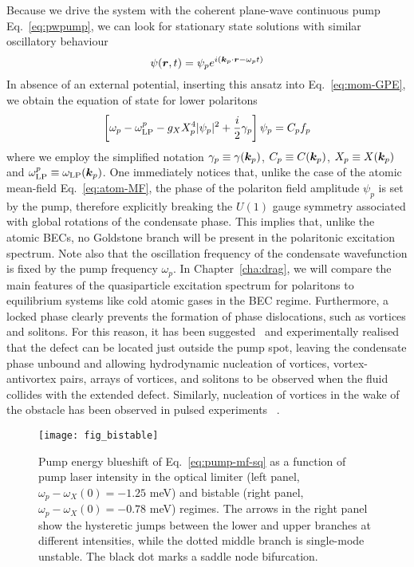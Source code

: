Because we drive the system with the coherent plane-wave continuous
pump Eq.~\eqref{eq:pwpump}, we can look for stationary state solutions
with similar oscillatory behaviour
%
\begin{equation}\label{eq:pump-ansatz}
  \psi(\bm{r},t) = \psi_p e^{i (\bm{k}_p \cdot \bm{r}- \omega_p t)}
\end{equation}
% 
In absence of an external potential, inserting this ansatz into
Eq.~\eqref{eq:mom-GPE}, we obtain the equation of state for lower
polaritons
%
\begin{equation}\label{eq:pump-mf}
  \left[ \omega_p - \omega^p_{\text{LP}} - g_X X_p^4 \vert \psi_p \vert^2 + \frac{i}{2}\gamma_p\right]\psi_p = C_p f_p
\end{equation}
% 
where we employ the simplified notation
$\gamma_p \equiv \gamma(\bm{k}_p)$, $C_p \equiv C(\bm{k}_p)$,
$X_p \equiv X(\bm{k}_p)$ and
$\omega^p_{\text{LP}} \equiv \omega_{\text{LP}}(\bm{k}_p)$. One
immediately notices that, unlike the case of the atomic mean-field
Eq.~\eqref{eq:atom-MF}, the phase of the polariton field amplitude
$\psi_p$ is set by the pump, therefore explicitly breaking the $U(1)$
gauge symmetry associated with global rotations of the condensate
phase. This implies that, unlike the atomic BECs, no Goldstone branch
will be present in the polaritonic excitation spectrum. Note also that
the oscillation frequency of the condensate wavefunction is fixed by
the pump frequency $\omega_p$. In Chapter~\ref{cha:drag}, we will
compare the main features of the quasiparticle excitation spectrum for
polaritons to equilibrium systems like cold atomic gases in the BEC
regime. Furthermore, a locked phase clearly prevents the formation of
phase dislocations, such as vortices and solitons. For this reason, it
has been suggested~\cite{Pigeon_2011} and experimentally
realised~\cite{Amo_2011} that the defect can be located just outside
the pump spot, leaving the condensate phase unbound and allowing
hydrodynamic nucleation of vortices, vortex-antivortex pairs, arrays
of vortices, and solitons to be observed when the fluid collides with
the extended defect. Similarly, nucleation of vortices in the wake of
the obstacle has been observed in pulsed experiments
~\cite{Nardin_2011,Sanvitto_2011}.


%
\begin{figure}[tb]\centering
  \texttt{[image: fig\_bistable]}
  \caption{
    Pump energy blueshift of Eq.~\eqref{eq:pump-mf-sq} as a function
    of pump laser intensity in the optical limiter (left panel, $\omega_p
    - \omega_X(0)= -1.25$ meV) and bistable (right panel, $\omega_p -
    \omega_X(0)= -0.78$ meV) regimes. The arrows in the right panel show
    the hysteretic jumps between the lower and upper branches at different
    intensities, while the dotted middle branch is single-mode
    unstable. The black dot marks a saddle node bifurcation.
  }\label{fig:bistable}
\end{figure}
%

